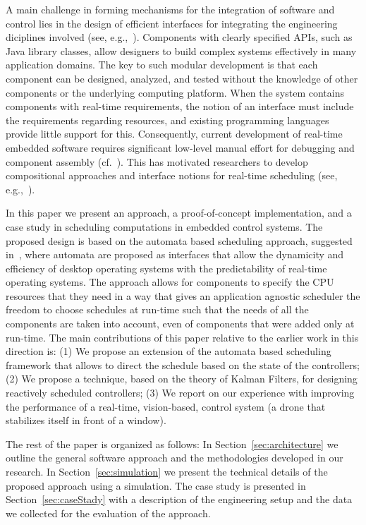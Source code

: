 \documentclass{sig-alternate-ipsn13}
\begin{document}
A main challenge in forming mechanisms for the integration of software and control lies in the design of efficient interfaces for integrating the engineering diciplines involved (see, e.g.,~\cite{weiss2007automata}). Components with clearly specified APIs, such as Java library classes, allow designers to build
complex systems effectively in many application domains.  The key to such modular development is
that each component can be designed, analyzed, and tested without the knowledge of other
components or the underlying computing platform. When the system contains components with
real-time requirements, the notion of an interface must include the requirements regarding
resources, and existing programming languages provide little support for this.  Consequently,
current development of real-time embedded software requires significant low-level manual effort for
debugging and component assembly (cf.~\cite{Lee00,IEEE03,HS06}).  This has motivated 
researchers to develop compositional approaches and interface notions for real-time scheduling (see, e.g.,~\cite{RS01,dH01,MF01,CAHS03,SL08,SLBS04,TWS06,DBLP:conf/lctrts/AuerbachBIKRRT07}).


In this paper we present an approach, a proof-of-concept implementation, and a case study in scheduling computations in embedded control systems. The proposed design is based on the automata based scheduling approach, suggested in~\cite{weiss2007automata,RTComposer,AW08,ESNAASHARI20102410,liu2013synthesis}, where automata are proposed as interfaces that allow the dynamicity and efficiency of desktop operating systems with the predictability of real-time operating systems. The approach allows for components to specify the CPU resources that they need in a way that gives an application agnostic scheduler the freedom to choose schedules at run-time such that the needs of all the components are taken into account, even of components that were added only at run-time.  The main contributions of this paper relative to the earlier work in this direction is:
(1) We propose an extension of the automata based scheduling framework that allows to direct the schedule based on the state of the controllers; (2) We propose a technique, based on the theory of Kalman Filters, for designing reactively scheduled controllers; (3) We report on our experience with improving the performance of a real-time, vision-based, control system (a drone that stabilizes itself in front of a window).

The rest of the paper is organized as follows: In Section~\ref{sec:architecture} we outline the general software approach and the methodologies developed in our research. In Section~\ref{sec:simulation} we present the technical details of the proposed approach using a simulation. The case study is presented in Section~\ref{sec:caseStady} with a description of the engineering setup and the data we collected for the evaluation of the approach.
\end{document}
